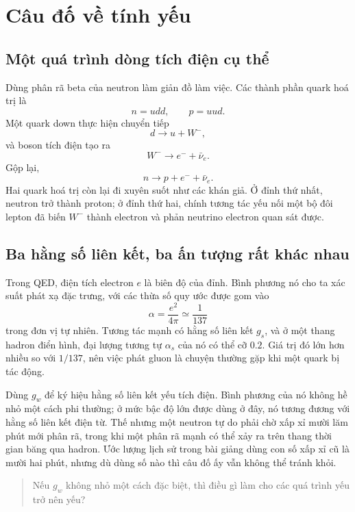 \section{Câu đố về tính yếu}

\subsection{Một quá trình dòng tích điện cụ thể}

Dùng phân rã beta của neutron làm giản đồ làm việc. Các thành phần quark hoá trị là
\begin{equation}
  n=udd,\qquad p=uud.
\end{equation}
Một quark down thực hiện chuyển tiếp
\begin{equation}
  d\longrightarrow u+W^-,
\end{equation}
và boson tích điện tạo ra
\begin{equation}
  W^-\longrightarrow e^-+\bar\nu_e.
\end{equation}
Gộp lại,
\begin{equation}
  n\longrightarrow p+e^-+\bar\nu_e.
\end{equation}
Hai quark hoá trị còn lại đi xuyên suốt như các khán giả. Ở đỉnh thứ nhất, neutron trở thành proton; ở đỉnh thứ hai, chính tương tác yếu nối một bộ đôi lepton đã biến \(W^-\) thành electron và phản neutrino electron quan sát được.

\subsection{Ba hằng số liên kết, ba ấn tượng rất khác nhau}

Trong QED, điện tích electron \(e\) là biên độ của đỉnh. Bình phương nó cho ta xác suất phát xạ đặc trưng, với các thừa số quy ước được gom vào
\begin{equation}
  \alpha=\frac{e^2}{4\pi}\simeq\frac1{137}
\end{equation}
trong đơn vị tự nhiên. Tương tác mạnh có hằng số liên kết \(g_s\), và ở một thang hadron điển hình, đại lượng tương tự \(\alpha_s\) của nó có thể cỡ \(0.2\).
Giá trị đó lớn hơn nhiều so với \(1/137\), nên việc phát gluon là chuyện thường gặp khi một quark bị tác động.

Dùng \(g_w\) để ký hiệu hằng số liên kết yếu tích điện. Bình phương của nó không hề nhỏ một cách phi thường; ở mức bậc độ lớn được dùng ở đây, nó tương đương với hằng số liên kết điện từ. Thế nhưng một neutron tự do phải chờ xấp xỉ mười lăm phút mới phân rã, trong khi một phân rã mạnh có thể xảy ra trên thang thời gian băng qua hadron. Ước lượng lịch sử trong bài giảng dùng con số xấp xỉ cũ là mười hai phút, nhưng dù dùng số nào thì câu đố ấy vẫn không thể tránh khỏi.
\begin{quote}
Nếu \(g_w\) không nhỏ một cách đặc biệt, thì điều gì làm cho các quá trình yếu trở nên yếu?
\end{quote}

